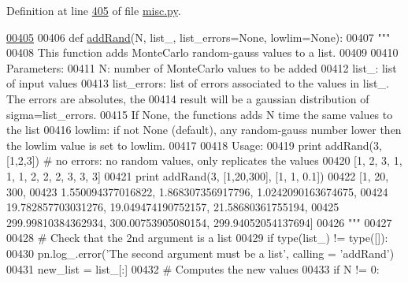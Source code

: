 Definition at line \hyperlink{misc_8py_source_l00405}{405} of file \hyperlink{misc_8py_source}{misc.\-py}.


\begin{DoxyCode}
\hypertarget{namespacepyneb_1_1utils_1_1misc_l00405}{}\hyperlink{namespacepyneb_1_1utils_1_1misc_af39dcb3c2627e5f29063e47ca4327f94}{00405} 
00406 \textcolor{keyword}{def }\hyperlink{namespacepyneb_1_1utils_1_1misc_af39dcb3c2627e5f29063e47ca4327f94}{addRand}(N, list\_, list\_errors=None, lowlim=None):
00407     \textcolor{stringliteral}{"""}
00408 \textcolor{stringliteral}{    This function adds MonteCarlo random-gauss values to a list.}
00409 \textcolor{stringliteral}{    }
00410 \textcolor{stringliteral}{    Parameters:}
00411 \textcolor{stringliteral}{        N: number of MonteCarlo values to be added}
00412 \textcolor{stringliteral}{        list\_: list of input values}
00413 \textcolor{stringliteral}{        list\_errors: list of errors associated to the values in list\_. The errors are absolutes, the }
00414 \textcolor{stringliteral}{            result will be a gaussian distribution of sigma=list\_errors.}
00415 \textcolor{stringliteral}{            If None, the functions adds N time the same values to the list}
00416 \textcolor{stringliteral}{        lowlim: if not None (default), any random-gauss number lower then the lowlim value is set to
       lowlim.}
00417 \textcolor{stringliteral}{        }
00418 \textcolor{stringliteral}{    Usage:}
00419 \textcolor{stringliteral}{        print addRand(3, [1,2,3]) # no errors: no random values, only replicates the values}
00420 \textcolor{stringliteral}{            [1, 2, 3, 1, 1, 1, 2, 2, 2, 3, 3, 3]}
00421 \textcolor{stringliteral}{        print addRand(3, [1,20,300], [1, 1, 0.1])}
00422 \textcolor{stringliteral}{            [1, 20, 300, }
00423 \textcolor{stringliteral}{            1.550094377016822, 1.868307356917796, 1.0242090163674675, }
00424 \textcolor{stringliteral}{            19.782857703031276, 19.049474190752157, 21.58680361755194, }
00425 \textcolor{stringliteral}{            299.99810384362934, 300.00753905080154, 299.94052054137694]}
00426 \textcolor{stringliteral}{    """}
00427     
00428     \textcolor{comment}{# Check that the 2nd argument is a list}
00429     \textcolor{keywordflow}{if} type(list\_) != type([]):
00430         pn.log\_.error(\textcolor{stringliteral}{'The second argument must be a list'}, calling = \textcolor{stringliteral}{'addRand'})
00431     new\_list = list\_[:]
00432     \textcolor{comment}{# Computes the new values}
00433     \textcolor{keywordflow}{if} N != 0:

\end{DoxyCode}
